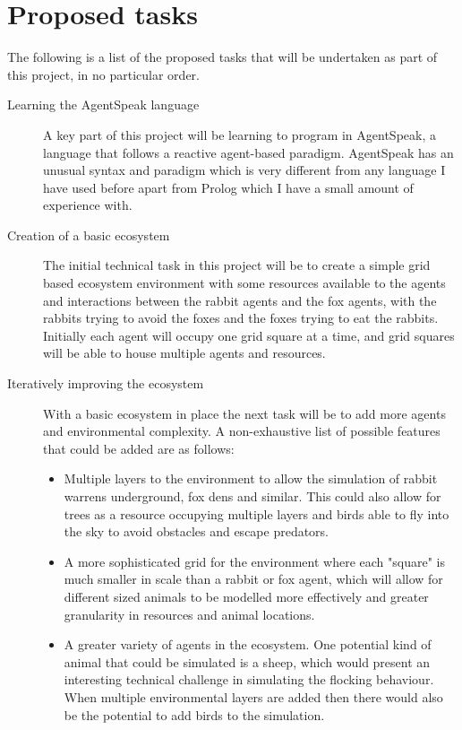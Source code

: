 \documentclass[11pt,fleqn,twoside]{article}
\begin{document}
\section{Proposed tasks}
The following is a list of the proposed tasks that will be undertaken as part of this project, in no particular order.
\begin{description}
	\item[Learning the AgentSpeak language]
	A key part of this project will be learning to program in AgentSpeak, a language that follows a reactive agent-based paradigm. AgentSpeak has an unusual syntax and paradigm which is very different from any language I have used before apart from Prolog which I have a small amount of experience with.
	\item[Creation of a basic ecosystem]
	The initial technical task in this project will be to create a simple grid based ecosystem environment with some resources available to the agents and interactions between the rabbit agents and the fox agents, with the rabbits trying to avoid the foxes and the foxes trying to eat the rabbits. Initially each agent will occupy one grid square at a time, and grid squares will be able to house multiple agents and resources.
	\item[Iteratively improving the ecosystem]
	With a basic ecosystem in place the next task will be to add more agents and environmental complexity. A non-exhaustive list of possible features that could be added are as follows:
	\begin{itemize}
	\item Multiple layers to the environment to allow the simulation of rabbit warrens underground, fox dens and similar. This could also allow for trees as a resource occupying multiple layers and birds able to fly into the sky to avoid obstacles and escape predators.
	\item A more sophisticated grid for the environment where each "square" is much smaller in scale than a rabbit or fox agent, which will allow for different sized animals to be modelled more effectively and greater granularity in resources and animal locations.
	\item A greater variety of agents in the ecosystem. One potential kind of animal that could be simulated is a sheep, which would present an interesting technical challenge in simulating the flocking behaviour. When multiple environmental layers are added then there would also be the potential to add birds to the simulation.

\end{itemize}
\end{description}
\end{document}
